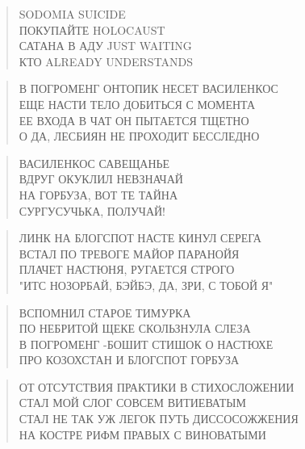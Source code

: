 \poemtitle{***}
\begin{verse}
SODOMIA SUICIDE\\
ПОКУПАЙТЕ HOLOCAUST\\
САТАНА В АДУ JUST WAITING\\
КТО ALREADY UNDERSTANDS
\end{verse}

\poemtitle{***}
\begin{verse}
В ПОГРОМЕНГ ОНТОПИК НЕСЕТ ВАСИЛЕНКОС\\
ЕЩЕ НАСТИ ТЕЛО ДОБИТЬСЯ С МОМЕНТА\\
ЕЕ ВХОДА В ЧАТ ОН ПЫТАЕТСЯ ТЩЕТНО\\
О ДА, ЛЕСБИЯН НЕ ПРОХОДИТ БЕССЛЕДНО
\end{verse}

\poemtitle{***}
\begin{verse}
ВАСИЛЕНКОС САВЕЩАНЬЕ\\
ВДРУГ ОКУКЛИЛ НЕВЗНАЧАЙ\\
НА ГОРБУЗА, ВОТ ТЕ ТАЙНА\\
СУРГУСУЧЬКА, ПОЛУЧАЙ!
\end{verse}

\poemtitle{***}
\begin{verse}
ЛИНК НА БЛОГСПОТ НАСТЕ КИНУЛ СЕРЕГА\\
ВСТАЛ ПО ТРЕВОГЕ МАЙОР ПАРАНОЙЯ\\
ПЛАЧЕТ НАСТЮНЯ, РУГАЕТСЯ СТРОГО\\
"ИТС НОЗОРБАЙ, БЭЙБЭ, ДА, ЗРИ, С ТОБОЙ Я"
\end{verse}

\poemtitle{***}
\begin{verse}
ВСПОМНИЛ СТАРОЕ ТИМУРКА\\
ПО НЕБРИТОЙ ЩЕКЕ СКОЛЬЗНУЛА СЛЕЗА\\
В ПОГРОМЕНГ -БОШИТ СТИШОК О НАСТЮХЕ\\
ПРО КОЗОХСТАН И БЛОГСПОТ ГОРБУЗА
\end{verse}

\poemtitle{***}
\begin{verse}
ОТ ОТСУТСТВИЯ ПРАКТИКИ В СТИХОСЛОЖЕНИИ\\
СТАЛ МОЙ СЛОГ СОВСЕМ ВИТИЕВАТЫМ\\
СТАЛ НЕ ТАК УЖ ЛЕГОК ПУТЬ ДИССОСОЖЖЕНИЯ\\
НА КОСТРЕ РИФМ ПРАВЫХ С ВИНОВАТЫМИ
\end{verse}

